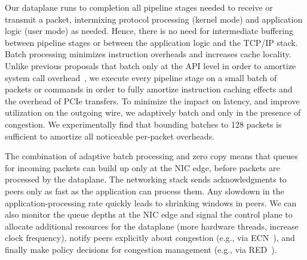  Our dataplane
runs to completion all pipeline stages needed to receive or transmit a
packet, intermixing protocol processing (kernel mode) and application
logic (user mode) as needed. Hence, there is no need for intermediate
buffering between pipeline stages or between the application logic and
the TCP/IP stack. Batch processing minimizes instruction overheads and
increases cache locality.  Unlike previous proposals that batch only
at the API level in order to amortize system call
overhead~\cite{jeong2014mtcp,han2012megapipe}, we execute every
pipeline stage on a small batch of packets or commands in order to
fully amortize instruction caching effects and the overhead of PCIe
transfers.  To minimize the impact on latency, and improve utilization
on the outgoing wire, we adaptively batch and only in the presence of
congestion.
We experimentally find that bounding batches to 128
packets is sufficient to amortize all noticeable per-packet overheads.

The combination of adaptive batch processing and zero copy means that
queues for incoming packets can build up only at the NIC edge, before
packets are processed by the dataplane. The networking stack sends
acknowledgments to peers only as fast as the application can process
them. Any slowdown in the application-processing rate quickly leads to
shrinking windows in peers. We can also monitor the queue
depths at the NIC edge and signal the control plane to allocate
additional resources for the dataplane (more hardware threads,
increase clock frequency), notify peers explicitly about congestion
(e.g., via ECN~\cite{ramakrishnan2001addition}), and finally make
policy decisions for congestion management (e.g., via
RED~\cite{DBLP:journals/ton/FloydJ93}).



